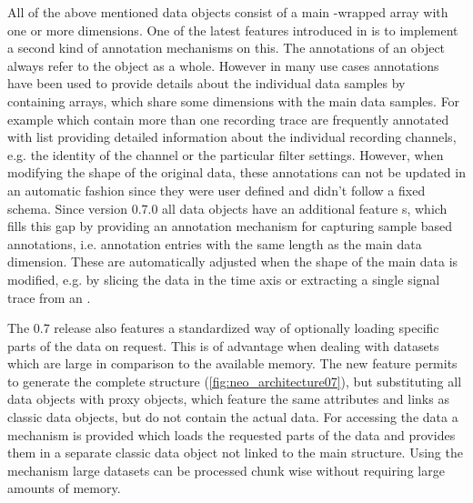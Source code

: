 All of the above mentioned data objects consist of a main -wrapped  array with one or more dimensions. One of the latest features introduced in  is to implement a second kind of annotation mechanisms on this. The annotations of an object always refer to the object as a whole. However in many use cases annotations have been used to provide details about the individual data samples by containing arrays, which share some dimensions with the main data samples. For example  which contain more than one recording trace are frequently annotated with list providing detailed information about the individual recording channels, e.g. the identity of the channel or the particular filter settings. However, when modifying the shape of the original data, these annotations can not be updated in an automatic fashion since they were user defined and didn't follow a fixed schema. Since  version 0.7.0 all data objects have an additional feature s, which fills this gap by providing an annotation mechanism for capturing sample based annotations, i.e. annotation entries with the same length as the main data dimension. These  are automatically adjusted when the shape of the main data is modified, e.g. by slicing the data in the time axis or extracting a single signal trace from an .

The  0.7 release also features a standardized way of optionally loading specific parts of the data on request. This is of advantage when dealing with datasets which are large in comparison to the available memory. The new  feature permits to generate the complete  structure (\cref{fig:neo_architecture07}), but substituting all data objects with proxy objects, which feature the same attributes and links as classic data objects, but do not contain the actual data. For accessing the data a  mechanism is provided which loads the requested parts of the data and provides them in a separate classic data object not linked to the main  structure. Using the  mechanism large datasets can be processed chunk wise without requiring large amounts of memory.

